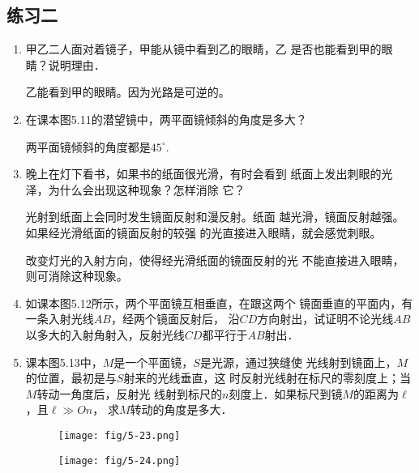 \subsection{练习二}
\begin{enumerate}
    \item 甲乙二人面对着镜子，甲能从镜中看到乙的眼睛，乙
    是否也能看到甲的眼睛？说明理由．

    \begin{solution}
        乙能看到甲的眼睛。因为光路是可逆的。
    \end{solution}
    
    \item 在课本图5.11的潜望镜中，两平面镜倾斜的角度是多大？

    \begin{solution}
        两平面镜倾斜的角度都是$45^{\circ}$.
    \end{solution}
    
    \item 晚上在灯下看书，如果书的纸面很光滑，有时会看到
    纸面上发出刺眼的光泽，为什么会出现这种现象？怎样消除
    它？

    \begin{solution}
        光射到纸面上会同时发生镜面反射和漫反射。纸面
        越光滑，镜面反射越强。如果经光滑纸面的镜面反射的较强
        的光直接进入眼睛，就会感觉刺眼。

        改变灯光的入射方向，使得经光滑纸面的镜面反射的光
        不能直接进入眼睛，则可消除这种现象。
    \end{solution}

    \item 如课本图5.12所示，两个平面镜互相垂直，在跟这两个
    镜面垂直的平面内，有一条入射光线$AB$，经两个镜面反射后，
    沿$CD$方向射出，试证明不论光线$AB$以多大的入射角射入，反射光线$CD$都平行于$AB$射出．



    \begin{solution}

    \end{solution}
    \item 课本图5.13中，$M$是一个平面镜，$S$是光源，通过狭缝使
    光线射到镜面上，$M$的位置，最初是与$S$射来的光线垂直，这
    时反射光线射在标尺的零刻度上；当$M$转动一角度后，反射光
    线射到标尺的$n$刻度上．如果标尺到镜$M$的距离为$\ell$，且$\ell\gg On$，
    求$M$转动的角度是多大．
    \begin{figure}[htp]
        \centering
        \begin{minipage}[t]{0.48\textwidth}
        \centering
\texttt{[image: fig/5-23.png]}
        \caption{}
        \end{minipage}
        \begin{minipage}[t]{0.48\textwidth}
        \centering
\texttt{[image: fig/5-24.png]}
        \caption{}
        \end{minipage}
        \end{figure}


\end{enumerate}
